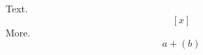 \documentclass{article}
\begin{document}
Text.
\begin{equation} \left[x\right] \end{equation}
More.
\begin{equation} a+\left(b\right) \label{q}\end{equation}
\end{document}

